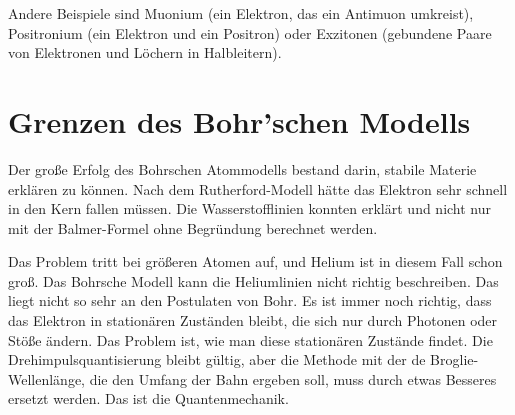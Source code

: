 Andere Beispiele sind Muonium (ein Elektron, das ein Antimuon umkreist), Positronium (ein Elektron und ein Positron) oder Exzitonen (gebundene Paare von Elektronen und Löchern in Halbleitern). 


\section{Grenzen des Bohr'schen Modells}

Der große Erfolg des Bohrschen Atommodells bestand darin, stabile Materie erklären zu können. Nach dem Rutherford-Modell hätte das Elektron sehr schnell in den Kern fallen müssen. Die Wasserstofflinien konnten erklärt und nicht nur mit der Balmer-Formel ohne Begründung berechnet werden.

Das Problem tritt bei größeren Atomen auf, und Helium ist in diesem Fall schon groß. Das Bohrsche Modell kann die Heliumlinien nicht richtig beschreiben. Das liegt nicht so sehr an den Postulaten von Bohr. Es ist immer noch richtig, dass das Elektron in stationären Zuständen bleibt, die sich nur durch Photonen oder Stöße ändern. Das Problem ist, wie man diese stationären Zustände findet. Die Drehimpulsquantisierung bleibt gültig, aber die Methode mit der de Broglie-Wellenlänge, die den Umfang der Bahn ergeben soll, muss durch etwas Besseres ersetzt werden. Das ist die Quantenmechanik.


\printbibliography[segment=\therefsegment,heading=subbibliography]
